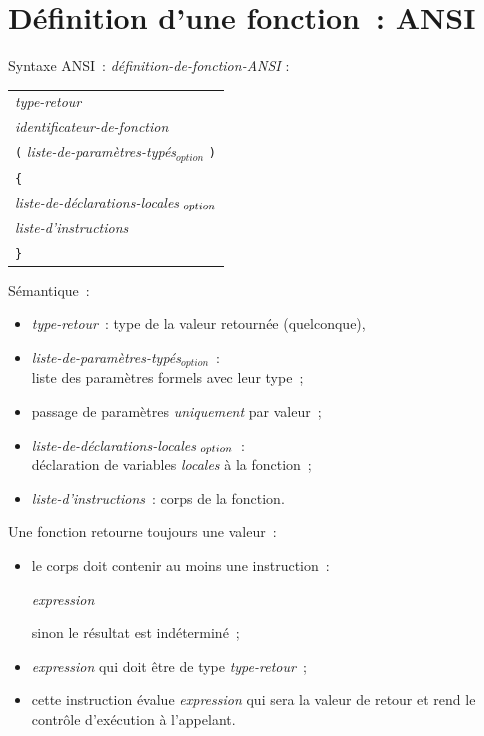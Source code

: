 \section{D\'efinition d'une fonction~: ANSI}
\begin{frame}[fragile]
  \alert{Syntaxe ANSI}~:
  {\it d\'{e}finition-de-fonction-ANSI} :
  \begin{center}
    \begin{tabular}[t]{l}
      {\it type-retour} \\
      {\it identificateur-de-fonction}
      \\
      {\tt (} \;
      {\it liste-de-param\`etres-typ\'es\/$_{option}$} \;
      {\tt )}
      \\
      {\tt \{} \\
      {\it liste-de-d\'{e}clarations-locales\/$_{\hspace{1mm}option}$}\\
      {\it liste-d'instructions}\\
      {\tt \}}
    \end{tabular}
  \end{center}
  \begin{overprint}
    \alert{S\'emantique}~:
    \begin{itemize}
    \item {\it type-retour}~: type de la valeur retourn\'ee (quelconque),
    \item {\it liste-de-param\`etres-typ\'es\/$_{option}$}~:\\
      \quad liste des param\`etres formels avec leur type~;
    \item passage de param\`etres {\em uniquement} par valeur~;
    \item {\it liste-de-d\'{e}clarations-locales\/$_{\hspace{1mm}option}$}~:\\
      \quad d\'eclaration de variables {\em locales} \`a la fonction~;
    \item {\it liste-d'instructions}~: corps de la fonction.
    \end{itemize}
    \alert{Une fonction retourne toujours une valeur}~: 
    \begin{itemize}
    \item le corps doit contenir au moins une
      instruction~: 
      \par
      \qquad {} \; {\it expression} \;{\tt ;}
     \par
      \hfill sinon le r\'esultat est ind\'etermin\'e~;
    \item {\it expression} qui doit \^etre de type {\it
        type-retour}~;
    \item cette instruction \'evalue {\it expression} qui sera la
      valeur de retour et rend le contr\^ole d'ex\'ecution \`a
      l'appelant.
  \end{itemize}
  \end{overprint}
\end{frame}
